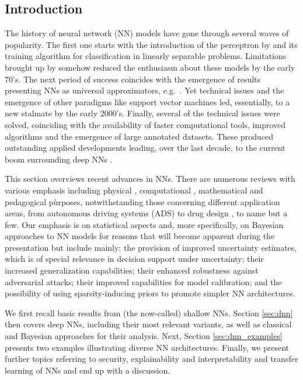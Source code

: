 
\subsection{Introduction}

The history of neural network (NN) models have gone 
through several waves of popularity. The first 
one starts with the introduction of the perceptron
by \parencite{rosenblatt1958perceptron} and its training algorithm 
for classification in linearly separable problems.
Limitations brought up by 
\parencite{minsky} somehow reduced the enthusiasm
about these models by the early 70's.
The next period of success coincides with the emergence
of results presenting NNs as universal
approximators, e.g.\ \parencite{cybenko1989approximation}. Yet 
technical issues and the emergence of other paradigms like 
support vector machines led, essentially,
to a new stalmate by the early 2000's. Finally, several of the 
technical issues were solved, coinciding with the 
availability of faster computational tools,
improved algorithms and the emergence of
large annotated datasets. These produced outstanding 
applied developments leading, over the last decade, to the current boom 
surrounding deep NNs \parencite{deeplearningbook}. 

This section overviews  
recent advances in NNs. 
There are numerous reviews with various emphasis 
including physical \parencite{cirac}, computational \parencite{chollet}, mathematical \parencite{maths} and pedagogical \parencite{teach} pùrposes, 
notwithstanding  those concerning different  application areas, 
from autonomous driving systems (ADS) \parencite{rumanos} to
drug design \parencite{hessler}, to name but a few. 
Our emphasis is on statistical
aspects and, more specifically, on Bayesian approaches
to NN models for reasons that will become 
apparent during the presentation but include mainly:
the provision of improved uncertainty estimates, which is
of special relevance in decision support under uncertainty; their 
increased generalization capabilities; their 
enhanced robustness against adversarial attacks; 
their improved capabilities for model calibration;
and the possibility of using sparsity-inducing priors
to promote simpler NN architectures.

We first recall basic results from (the now-called) 
shallow NNs.
Section \ref{sec:dnn} then covers deep NNs, including their most
relevant 
variants, as well as classical and Bayesian approaches
for their analysis. Next, Section \ref{sec:dnn_examples}
presents two examples illustrating
diverse NN architectures. Finally, we present 
further topics referring to security, explainability and
interpretability and transfer 
learning of NNs and end up with a discussion.

